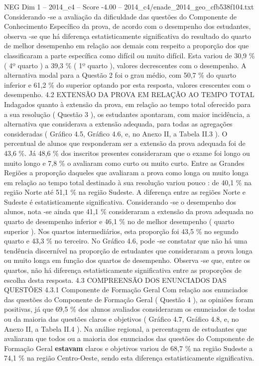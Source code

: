 \begin{textsample}{NEG Dim 1 – 2014\_c4 – Score -4.00 – 2014\_c4/enade\_2014\_geo\_cfb538f104.txt}
Considerando -se a avaliação da dificuldade das questões do Componente de Conhecimento Específico da prova, de acordo com o desempenho dos estudantes, observa -se que há diferença estatisticamente significativa do resultado do quarto de melhor desempenho em relação aos demais com respeito a proporção dos que classificaram a parte específica como difícil ou muito difícil.
Esta variou de 30,9 \% ( 4º quarto ) a 39,3 \% ( 1º quarto ), valores decrescentes com o desempenho.
A alternativa modal para a Questão 2 foi o grau médio, com 50,7 \% do quarto inferior e 61,2 \% do superior optando por esta resposta, valores crescentes com o desempenho. 4.2 EXTENSÃO DA PROVA EM RELAÇÃO AO TEMPO TOTAL Indagados quanto à extensão da prova, em relação ao tempo total oferecido para a sua resolução ( Questão 3 ), os estudantes apontaram, com maior incidência, a alternativa que considerava a extensão adequada, para todas as agregações consideradas ( Gráfico 4.5, Gráfico 4.6, e, no Anexo II, a Tabela II.3 ).
O percentual de alunos que responderam ser a extensão da prova adequada foi de 43,6 \%.
Já 48,6 \% dos inscritos presentes consideraram que o exame foi longo ou muito longo e 7,8 \% o avaliaram como curto ou muito curto.
Entre as Grandes Regiões a proporção daqueles que avaliaram a prova como longa ou muito longa em relação ao tempo total destinado à sua resolução variou pouco : de 40,1 \% na região Norte até 51,1 \% na região Sudeste.
A diferença entre as regiões Norte e Sudeste é estatisticamente significativa.
Considerando -se o desempenho dos alunos, nota -se ainda que 41,1 \% consideraram a extensão da prova adequada no quarto de desempenho inferior e 46,1 \% no de melhor desempenho ( quarto superior ).
Nos quartos intermediários, esta proporção foi 43,5 \% no segundo quarto e 43,3 \% no terceiro.
No Gráfico 4.6, pode -se constatar que não há uma tendência discernível na proporção de estudantes que consideraram a prova longa ou muito longa em função dos quartos de desempenho.
Observa -se que, entre os quartos, não há diferença estatisticamente significativa entre as proporções de escolha desta resposta. 4.3 COMPREENSÃO DOS ENUNCIADOS DAS QUESTÕES 4.3.1 Componente de Formação Geral Com relação aos enunciados das questões do Componente de Formação Geral ( Questão 4 ), as opiniões foram positivas, já que 69,5 \% dos alunos avaliados consideraram os enunciados de todas ou da maioria das questões claros e objetivos ( Gráfico 4.7, Gráfico 4.8, e, no Anexo II, a Tabela II.4 ).
Na análise regional, a percentagem de estudantes que avaliaram que todos ou a maioria dos enunciados das questões do Componente de Formação Geral \textbf{estavam} claros e objetivos variou de 68,7 \% na região Sudeste a 74,1 \% na região Centro-Oeste, sendo esta diferença estatisticamente significativa.

\end{textsample}
